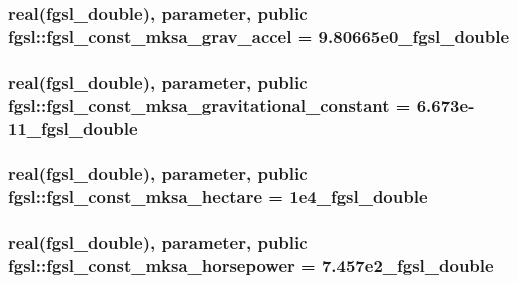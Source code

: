 \hypertarget{classfgsl_a7c644841a5ff5cd815dca7cfc3383642}{
\subsubsection[{fgsl\-\_\-const\-\_\-mksa\-\_\-grav\-\_\-accel}]{\setlength{\rightskip}{0pt plus 5cm}real({\bf fgsl\-\_\-double}), parameter, public fgsl\-::fgsl\-\_\-const\-\_\-mksa\-\_\-grav\-\_\-accel = 9.\-80665e0\-\_\-fgsl\-\_\-double}}\label{classfgsl_a7c644841a5ff5cd815dca7cfc3383642}
\hypertarget{classfgsl_a74c4f68c51be744dc16f9de6679690a1}{
\subsubsection[{fgsl\-\_\-const\-\_\-mksa\-\_\-gravitational\-\_\-constant}]{\setlength{\rightskip}{0pt plus 5cm}real({\bf fgsl\-\_\-double}), parameter, public fgsl\-::fgsl\-\_\-const\-\_\-mksa\-\_\-gravitational\-\_\-constant = 6.\-673e-\/11\-\_\-fgsl\-\_\-double}}\label{classfgsl_a74c4f68c51be744dc16f9de6679690a1}
\hypertarget{classfgsl_a62efb1288447e01349bbf38c21b82e70}{
\subsubsection[{fgsl\-\_\-const\-\_\-mksa\-\_\-hectare}]{\setlength{\rightskip}{0pt plus 5cm}real({\bf fgsl\-\_\-double}), parameter, public fgsl\-::fgsl\-\_\-const\-\_\-mksa\-\_\-hectare = 1e4\-\_\-fgsl\-\_\-double}}\label{classfgsl_a62efb1288447e01349bbf38c21b82e70}
\hypertarget{classfgsl_af97c5cddea274909ba83c36dc36e90a3}{
\subsubsection[{fgsl\-\_\-const\-\_\-mksa\-\_\-horsepower}]{\setlength{\rightskip}{0pt plus 5cm}real({\bf fgsl\-\_\-double}), parameter, public fgsl\-::fgsl\-\_\-const\-\_\-mksa\-\_\-horsepower = 7.\-457e2\-\_\-fgsl\-\_\-double}}\label{classfgsl_af97c5cddea274909ba83c36dc36e90a3}
